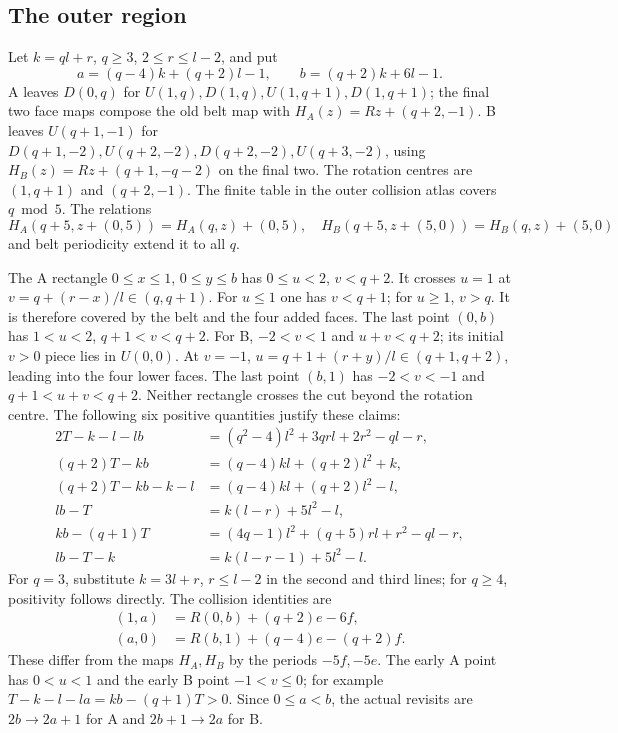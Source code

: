 \documentclass[11pt]{amsart}
\begin{document}
\subsection{The outer region}
Let $k=ql+r$, $q\ge3$, $2\le r\le l-2$, and put
\[
 a=(q-4)k+(q+2)l-1,\qquad b=(q+2)k+6l-1.
\]
A leaves $D(0,q)$ for $U(1,q),D(1,q),U(1,q+1),D(1,q+1)$;
the final two face maps compose the old belt map with
$H_A(z)=Rz+(q+2,-1)$. B leaves $U(q+1,-1)$ for
$D(q+1,-2),U(q+2,-2),D(q+2,-2),U(q+3,-2)$, using
$H_B(z)=Rz+(q+1,-q-2)$ on the final two. The rotation centres are
$(1,q+1)$ and $(q+2,-1)$. The finite table
in the outer collision atlas covers $q\bmod5$.
The relations
\[
 H_A(q+5,z+(0,5))=H_A(q,z)+(0,5),\quad
 H_B(q+5,z+(5,0))=H_B(q,z)+(5,0)
\]
and belt periodicity extend it to all $q$.

The A rectangle $0\le x\le1$, $0\le y\le b$ has $0\le u<2$,
$v<q+2$. It crosses $u=1$ at $v=q+(r-x)/l\in(q,q+1)$.
For $u\le1$ one has $v<q+1$; for $u\ge1$, $v>q$. It is therefore
covered by the belt and the four added faces. The last point $(0,b)$
has $1<u<2$, $q+1<v<q+2$.
For B, $-2<v<1$ and $u+v<q+2$; its initial $v>0$ piece lies in
$U(0,0)$. At $v=-1$, $u=q+1+(r+y)/l\in(q+1,q+2)$, leading into
the four lower faces. The last point $(b,1)$ has $-2<v<-1$ and
$q+1<u+v<q+2$. Neither rectangle crosses the cut beyond the rotation
centre. The following six positive quantities justify these claims:
\begin{align*}
2T-k-l-lb&=(q^2-4)l^2+3qrl+2r^2-ql-r,\\
(q+2)T-kb&=(q-4)kl+(q+2)l^2+k,\\
(q+2)T-kb-k-l&=(q-4)kl+(q+2)l^2-l,\\
lb-T&=k(l-r)+5l^2-l,\\
kb-(q+1)T&=(4q-1)l^2+(q+5)rl+r^2-ql-r,\\
lb-T-k&=k(l-r-1)+5l^2-l.
\end{align*}
For $q=3$, substitute $k=3l+r$, $r\le l-2$ in the second and third
lines; for $q\ge4$, positivity follows directly. The collision identities are
\begin{equation}\label{eq:7}
\begin{aligned}
(1,a)&=R(0,b)+(q+2)e-6f,\\
(a,0)&=R(b,1)+(q-4)e-(q+2)f.
\end{aligned}\tag{7}
\end{equation}
These differ from the maps $H_A,H_B$ by the periods $-5f,-5e$.
The early A point has $0<u<1$ and the early B point $-1<v\le0$;
for example $T-k-l-la=kb-(q+1)T>0$. Since $0\le a<b$, the actual
revisits are $2b\to2a+1$ for A and $2b+1\to2a$ for B.
\end{document}
